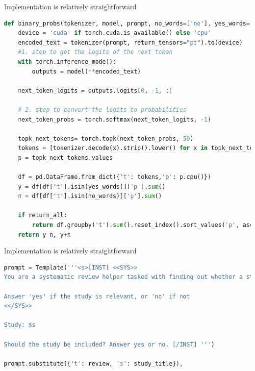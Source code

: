 \documentclass[9pt,aspectratio=169]{beamer}
\begin{document}
\begin{frame}[fragile]{Implementation is relatively straightforward}
\small
\begin{lstlisting}[language=Python]
def binary_probs(tokenizer, model, prompt, no_words=['no'], yes_words=['yes'], return_all=False):
    device = 'cuda' if torch.cuda.is_available() else 'cpu'
    encoded_text = tokenizer(prompt, return_tensors="pt").to(device)
    #1. step to get the logits of the next token
    with torch.inference_mode():
        outputs = model(**encoded_text)

    next_token_logits = outputs.logits[0, -1, :]

    # 2. step to convert the logits to probabilities
    next_token_probs = torch.softmax(next_token_logits, -1)

    topk_next_tokens= torch.topk(next_token_probs, 50)
    tokens = [tokenizer.decode(x).strip().lower() for x in topk_next_tokens.indices]
    p = topk_next_tokens.values

    df = pd.DataFrame.from_dict({'t': tokens,'p': p.cpu()})
    y = df[df['t'].isin(yes_words)]['p'].sum()
    n = df[df['t'].isin(no_words)]['p'].sum()

    if return_all:
        return df.groupby('t').sum().reset_index().sort_values('p', ascending=False).reset_index(drop=True)
    return y-n, y+n
\end{lstlisting}

\end{frame}

\begin{frame}[fragile]{Implementation is relatively straightforward}
	

	\small
\begin{lstlisting}[language=Python]
prompt = Template('''<s>[INST] <<SYS>>
You are a systematic review helper tasked with finding out whether a study is relevant to the review $t

Answer 'yes' if the study is relevant, or 'no' if not
<</SYS>>

Study: $s 

Should the study be included? Answer yes or no. [/INST] ''')

prompt.substitute({'t': review, 's': study_title}),
\end{lstlisting}


\end{frame}
\end{document}
